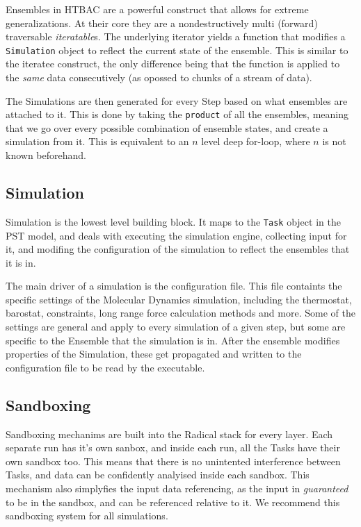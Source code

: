 Ensembles in HTBAC are a powerful construct that allows for extreme
generalizations. At their core they are a nondestructively multi (forward)
traversable \emph{iteratable}s. The underlying iterator yields a function
that modifies a \texttt{Simulation} object to reflect the current state of
the ensemble. This is similar to the iteratee construct, the only difference
being that the function is applied to the \emph{same} data consecutively (as
opossed to chunks of a stream of data).

The Simulations are then generated for every Step based on what ensembles are
attached to it. This is done by taking the \texttt{product} of all the
ensembles, meaning that we go over every possible combination of ensemble
states, and create a simulation from it. This is equivalent to an $n$ level
deep for-loop, where $n$ is not known beforehand.

\subsection{Simulation}

Simulation is the lowest level building block. It maps to the \texttt{Task}
object in the PST model, and deals with executing the simulation engine,
collecting input for it, and modifing the configuration of the simulation to
reflect the ensembles that it is in.

The main driver of a simulation is the configuration file. This file
containts the specific settings of the Molecular Dynamics simulation,
including the thermostat, barostat, constraints, long range force calculation
methods and more. Some of the settings are general and apply to every
simulation of a given step, but some are specific to the Ensemble that the
simulation is in. After the ensemble modifies properties of the Simulation,
these get propagated and written to the configuration file to be read by the
executable.

\subsection{Sandboxing}

Sandboxing mechanims are built into the Radical stack for every layer. Each
separate run has it's own sanbox, and inside each run, all the Tasks have
their own sandbox too. This means that there is no unintented interference
between Tasks, and data can be confidently analyised inside each sandbox.
This mechanism also simplyfies the input data referencing, as the input in
\emph{guaranteed} to be in the sandbox, and can be referenced relative to it.
We recommend this sandboxing system for all simulations.

